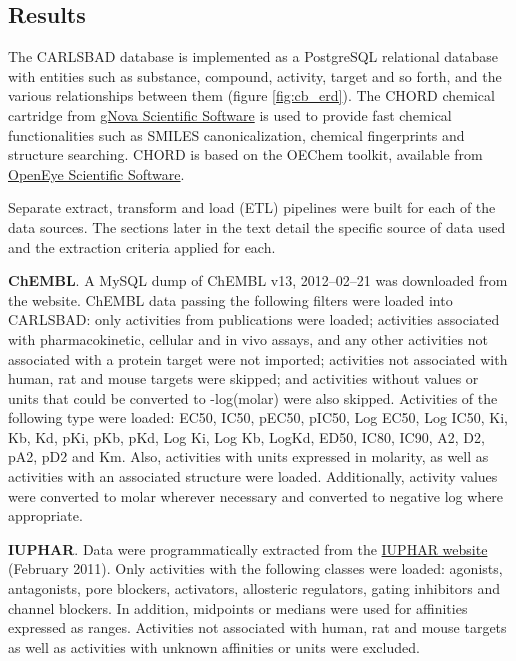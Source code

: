 \subsection{Results}

The CARLSBAD database is implemented as a PostgreSQL relational database with entities such as substance, compound, activity, target and so forth, and the various relationships between them (figure \ref{fig:cb_erd}). The CHORD chemical cartridge from \href{https://www.gnova.com/}{gNova Scientific Software} is used to provide fast chemical functionalities such as SMILES canonicalization\cite{Weininger1989-kh}, chemical fingerprints and structure searching. CHORD is based on the OEChem toolkit, available from \href{https://www.eyesopen.com/}{OpenEye Scientific Software}.


Separate extract, transform and load (ETL) pipelines were built for each of the data sources. The sections later in the text detail the specific source of data used and the extraction criteria applied for each.

\textbf{ChEMBL}. A MySQL dump of ChEMBL v13, 2012–02–21 was downloaded from the website. ChEMBL data passing the following filters were loaded into CARLSBAD: only activities from publications were loaded; activities associated with pharmacokinetic, cellular and in vivo assays, and any other activities not associated with a protein target were not imported; activities not associated with human, rat and mouse targets were skipped; and activities without values or units that could be converted to -log(molar) were also skipped. Activities of the following type were loaded: EC50, IC50, pEC50, pIC50, Log EC50, Log IC50, Ki, Kb, Kd, pKi, pKb, pKd, Log Ki, Log Kb, LogKd, ED50, IC80, IC90, A2, D2, pA2, pD2 and Km. Also, activities with units expressed in molarity, as well as activities with an associated structure were loaded. Additionally, activity values were converted to molar wherever necessary and converted to negative log where appropriate.

\textbf{IUPHAR}. Data were programmatically extracted from the \href{http://www.iuphar-db.org/}{IUPHAR website} (February 2011). Only activities with the following classes were loaded: agonists, antagonists, pore blockers, activators, allosteric regulators, gating inhibitors and channel blockers. In addition, midpoints or medians were used for affinities expressed as ranges. Activities not associated with human, rat and mouse targets as well as activities with unknown affinities or units were excluded.

